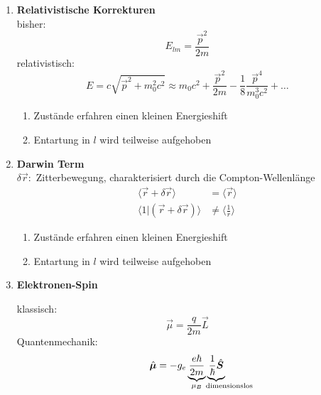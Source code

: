 \begin{enumerate}[1)]
	\item \textbf{Relativistische Korrekturen}\\
	bisher:
	\begin{equation*}
	E_{lm} = \frac{\vec{p}^2}{2m}
	\end{equation*}
	relativistisch:
	\begin{equation*}
	E = c \sqrt{\vec{p}^2 + m_0^2 c^2} \approx m_0 c^2 + \frac{\vec{p}^2}{2m} - \frac{1}{8} \frac{\vec{p}^4}{m_0^3 c^2} + \dots
	\end{equation*}
	\begin{enumerate}[$ \Rightarrow $]
		\item Zustände erfahren einen kleinen Energieshift
		\item Entartung in $ l $ wird teilweise aufgehoben
	\end{enumerate}
	\item \textbf{Darwin Term}\\
	$ \delta \vec{r} : $ Zitterbewegung, charakterisiert durch die Compton-Wellenlänge
	\begin{align*}
	\langle \vec{r} + \delta \vec{r} \rangle &= \langle \vec{r} \rangle \\
	\langle 1 | (\vec{r} + \delta \vec{r}) \rangle &\neq \langle \frac{1}{r} \rangle
	\end{align*}
	\begin{enumerate}[$ \Rightarrow $]
		\item Zustände erfahren einen kleinen Energieshift
		\item Entartung in $ l $ wird teilweise aufgehoben
	\end{enumerate}
	\item \textbf{Elektronen-Spin}\\
	\begin{minipage}{.8\linewidth}
		klassisch:
		\begin{equation*}
		\vec{\mu} = \frac{q}{2m} \vec{L}
		\end{equation*}
		Quantenmechanik:
		\begin{equation*}
		\hat{\vec{\mu}} = - g_e \ub{\frac{e \hbar}{2m}}_{\mu_{B}} \ub{\frac{1}{\hbar} \hat{\vec{S}}}_{\mathclap{ \qquad \ \ \tx{dimensionslos}}}
		\end{equation*}
	\end{minipage}%
	\begin{minipage}{.2\linewidth}
		\flushright
\end{minipage}
\end{enumerate}
